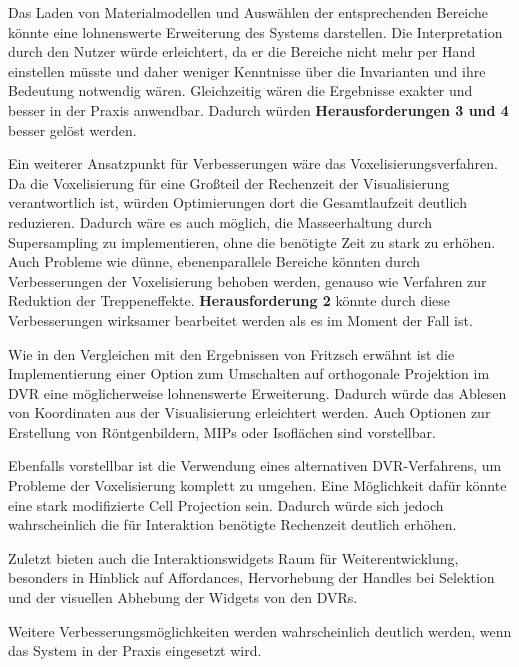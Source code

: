 \documentclass[a4paper,fontsize=12pt,toc=bib,parskip=half,ngerman]{scrartcl}
\begin{document}
Das Laden von Materialmodellen und Ausw\"ahlen der entsprechenden Bereiche k\"onnte eine lohnenswerte Erweiterung des Systems darstellen. Die Interpretation durch den Nutzer w\"urde erleichtert, da er die Bereiche nicht mehr per Hand einstellen m\"usste und daher weniger Kenntnisse \"uber die Invarianten und ihre Bedeutung notwendig w\"aren. Gleichzeitig w\"aren die Ergebnisse exakter und besser in der Praxis anwendbar. Dadurch w\"urden \textbf{Herausforderungen 3 und 4} besser gel\"ost werden. 

Ein weiterer Ansatzpunkt f\"ur Verbesserungen w\"are das Voxelisierungsverfahren. Da die Voxelisierung f\"ur eine Gro{\ss}teil der Rechenzeit der Visualisierung verantwortlich ist, w\"urden Optimierungen dort die Gesamtlaufzeit deutlich reduzieren. Dadurch w\"are es auch m\"oglich, die Masseerhaltung durch Supersampling zu implementieren, ohne die ben\"otigte Zeit zu stark zu erh\"ohen. Auch Probleme wie d\"unne, ebenenparallele Bereiche k\"onnten durch Verbesserungen der Voxelisierung behoben werden, genauso wie Verfahren zur Reduktion der Treppeneffekte. \textbf{Herausforderung 2} k\"onnte durch diese Verbesserungen wirksamer bearbeitet werden als es im Moment der Fall ist.

Wie in den Vergleichen mit den Ergebnissen von Fritzsch erw\"ahnt ist die Implementierung einer Option zum Umschalten auf orthogonale Projektion im DVR eine m\"oglicherweise lohnenswerte Erweiterung. Dadurch w\"urde das Ablesen von Koordinaten aus der Visualisierung erleichtert werden. Auch Optionen zur Erstellung von R\"ontgenbildern, MIPs oder Isofl\"achen sind vorstellbar.

Ebenfalls vorstellbar ist die Verwendung eines alternativen DVR-Verfahrens, um Probleme der Voxelisierung komplett zu umgehen. Eine M\"oglichkeit daf\"ur k\"onnte eine stark modifizierte Cell Projection sein. Dadurch w\"urde sich jedoch wahrscheinlich die f\"ur Interaktion ben\"otigte Rechenzeit deutlich erh\"ohen.

Zuletzt bieten auch die Interaktionswidgets Raum f\"ur Weiterentwicklung, besonders in Hinblick auf Affordances, Hervorhebung der Handles bei Selektion und der visuellen Abhebung der Widgets von den DVRs.
 
Weitere Verbesserungsm\"oglichkeiten werden wahrscheinlich deutlich werden, wenn das System in der Praxis eingesetzt wird. 
\end{document}
